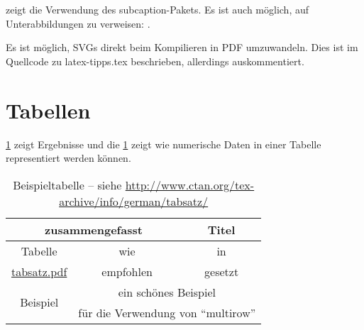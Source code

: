 zeigt die Verwendung des subcaption-Pakets.
Es ist auch möglich, auf Unterabbildungen zu verweisen: .

Es ist möglich, SVGs direkt beim Kompilieren in PDF umzuwandeln.
Dies ist im Quellcode zu latex-tipps.tex beschrieben, allerdings auskommentiert.

\iffalse %
  Das SVG in \cref{fig:directSVG} ist direkt eingebunden, während der Text im SVG in \cref{fig:latexSVG} mittels pdflatex gesetzt ist.
  Falls man die Graphiken sehen möchte, muss inkscape im PATH sein und im Tex-Quelltext \texttt{\textbackslash{}iffalse} und \texttt{\textbackslash{}iftrue} auskommentiert sein.

  \begin{figure}
    \centering
    \texttt{[image: svgexample.svg]}
    \caption{SVG direkt eingebunden}
    \label{fig:directSVG}
  \end{figure}

  \begin{figure}
    \centering
    \def\svgwidth{.4\textwidth}
    
    \caption{Text im SVG mittels \LaTeX{} gesetzt}
    \label{fig:latexSVG}
  \end{figure}
\fi %

\section{Tabellen}

\cref{tab:Ergebnisse} zeigt Ergebnisse und die \cref{tab:Ergebnisse} zeigt wie numerische Daten in einer Tabelle representiert werden können.
\begin{table}
  \centering
  \begin{tabular}{ccc}
    \toprule
    \multicolumn{2}{c}{\textbf{zusammengefasst}} & \textbf{Titel}                                                          \\ \midrule
    Tabelle                                      & wie                                                           & in      \\
    \url{tabsatz.pdf}                            & empfohlen                                                     & gesetzt \\

    \multirow{2}{*}{Beispiel}                    & \multicolumn{2}{c}{ein schönes Beispiel}                                \\
                                                 & \multicolumn{2}{c}{für die Verwendung von \enquote{multirow}}           \\
    \bottomrule
  \end{tabular}
  \caption[Beispieltabelle]{Beispieltabelle -- siehe \url{http://www.ctan.org/tex-archive/info/german/tabsatz/}}
  \label{tab:Ergebnisse}
\end{table}

